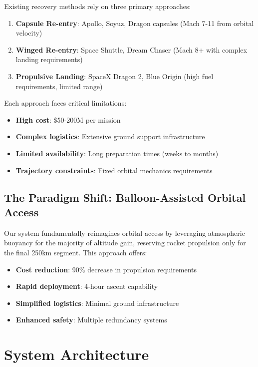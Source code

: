\documentclass[11pt,a4paper]{article}
\begin{document}
Existing recovery methods rely on three primary approaches:
\begin{enumerate}
    \item \textbf{Capsule Re-entry}: Apollo, Soyuz, Dragon capsules (Mach 7-11 from orbital velocity)
    \item \textbf{Winged Re-entry}: Space Shuttle, Dream Chaser (Mach 8+ with complex landing requirements)
    \item \textbf{Propulsive Landing}: SpaceX Dragon 2, Blue Origin (high fuel requirements, limited range)
\end{enumerate}

Each approach faces critical limitations:
\begin{itemize}
    \item \textbf{High cost}: \$50-200M per mission
    \item \textbf{Complex logistics}: Extensive ground support infrastructure
    \item \textbf{Limited availability}: Long preparation times (weeks to months)
    \item \textbf{Trajectory constraints}: Fixed orbital mechanics requirements
\end{itemize}

\subsection{The Paradigm Shift: Balloon-Assisted Orbital Access}

Our system fundamentally reimagines orbital access by leveraging atmospheric buoyancy for the majority of altitude gain, reserving rocket propulsion only for the final 250km segment. This approach offers:

\begin{itemize}
    \item \textbf{Cost reduction}: 90\% decrease in propulsion requirements
    \item \textbf{Rapid deployment}: 4-hour ascent capability
    \item \textbf{Simplified logistics}: Minimal ground infrastructure
    \item \textbf{Enhanced safety}: Multiple redundancy systems
\end{itemize}

\section{System Architecture}
\end{document}
